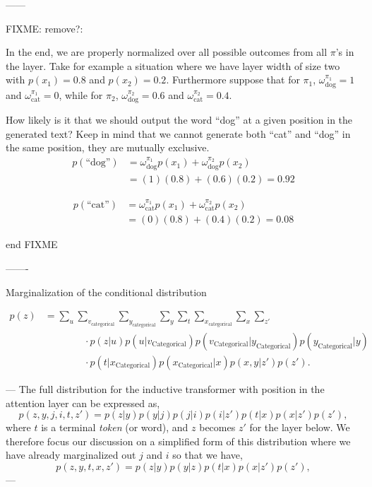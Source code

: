 ------

FIXME: remove?:

In the end, we are properly normalized over all possible outcomes from all $\pi$'s in the layer.  Take for example a situation where we have layer width of size two with  
 $p(x_1)=0.8$ and $p(x_2)=0.2$. Furthermore suppose that for $\pi_1$, $\omega^{\pi_1}_{\text{dog}} = 1$ and $\omega^{\pi_1}_{\text{cat}} = 0$, while for $\pi_2$, $\omega^{\pi_2}_{\text{dog}} = 0.6$ and $\omega^{\pi_2}_{\text{cat}} = 0.4$.

How likely is it that we should output the word ``dog'' at a given position in the generated text?  Keep in mind that we cannot generate both ``cat'' and ``dog'' in the same position, they are mutually exclusive. 
\begin{align}
    p(\text{``dog''}) 
    &= \omega^{\pi_1}_{\text{dog}}p(x_1) + \omega^{\pi_2}_{\text{dog}}p(x_2) \\
    &= (1)(0.8) + (0.6)(0.2) = 0.92
\end{align}  

\begin{align}
    p(\text{``cat''}) 
    &= \omega^{\pi_1}_{\text{cat}}p(x_1) + \omega^{\pi_2}_{\text{cat}}p(x_2) \\
    &= (0)(0.8) + (0.4)(0.2) = 0.08
\end{align}  

end FIXME


-------

Marginalization of the conditional distribution


\begin{align}
p(z) 
&= 
\sum_u \sum_{v_\text{categorical}} \sum_{y_\text{categorical}} \sum_y \sum_t \sum_{x_\text{categorical}} \sum_x \sum_{z'} \nonumber \\
&\quad\quad\quad\quad \cdot p(z|u)p(u|v_{\text{Categorical}})p(v_{\text{Categorical}}|y_{\text{Categorical}})p(y_{\text{Categorical}}|y) \nonumber \\
&\quad\quad\quad\quad \cdot p(t|x_{\text{Categorical}})p(x_{\text{Categorical}}|x)p(x, y|z')p(z').
\end{align}


---
The full distribution for the inductive transformer with position in the attention layer can be expressed as,
\begin{equation}
p(z, y, j, i, t, z') = p(z|y)p(y|j)p(j|i)p(i|z')p(t|x)p(x|z')p(z'),
\end{equation}
where $t$ is a terminal \emph{token} (or word), and $z$ becomes $z'$ for the layer below.  We therefore focus our discussion on a simplified form of this distribution where we have already marginalized out $j$ and $i$ so that we have,
\begin{equation}
p(z, y, t, x, z') = p(z|y)p(y|z)p(t|x)p(x|z')p(z'),
\end{equation}
---

